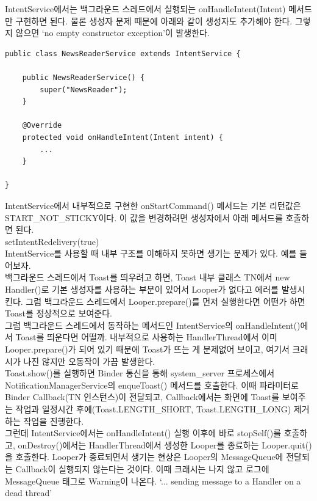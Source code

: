 IntentService에서는 백그라운드 스레드에서 실행되는 onHandleIntent(Intent) 메서드만 구현하면 된다.
물론 생성자 문제 때문에 아래와 같이 생성자도 추가해야 한다. 그렇지 않으면 `no empty constructor exception'이 발생한다. 
\begin{lstlisting}[frame=single]
public class NewsReaderService extends IntentService {

	public NewsReaderService() {
		super("NewsReader");
	}

	@Override
	protected void onHandleIntent(Intent intent) {
		...
	}
	
}	
\end{lstlisting}
IntentService에서 내부적으로 구현한 onStartCommand() 메서드는 기본 리턴값은 START\_NOT\_STICKY이다. 이 값을 변경하려면 생성자에서 아래 메서드를 호출하면 된다.\\ 

setIntentRedelivery(true)\\

IntentService를 사용할 때 내부 구조를 이해하지 못하면 생기는 문제가 있다. 
예를 들어보자.\\

백그라운드 스레드에서 Toast를 띄우려고 하면, Toast 내부 클래스 TN에서 new Handler()로 기본 생성자를 사용하는 부분이 있어서 Looper가 없다고 에러를 발생시킨다. 그럼 백그라운드 스레드에서 Looper.prepare()를 먼저 실행한다면 어떤가 하면 Toast를 정상적으로 보여준다.\\

그럼 백그라운드 스레드에서 동작하는 메서드인 IntentService의 onHandleIntent()에서 Toast를 띄운다면 어떨까. 
내부적으로 사용하는 HandlerThread에서 이미 Looper.prepare()가 되어 있기 때문에 Toast가 뜨는 게 문제없어 보이고, 여기서 크래시가 나진 않지만 오동작이 가끔 발생한다.\\

Toast.show()를 실행하면 Binder 통신을 통해 system\_server 프로세스에서 NotificationManagerService의 enqueToast() 메서드를 호출한다. 이때 파라미터로 Binder Callback(TN 인스턴스)이 전달되고, Callback에서는 화면에 Toast를 보여주는 작업과 일정시간 후에(Toast.LENGTH\_SHORT, Toast.LENGTH\_LONG) 제거하는 작업을 진행한다.\\

그런데 IntentService에서는 onHandleIntent() 실행 이후에 바로 stopSelf()를 호출하고, onDestroy()에서는 HandlerThread에서 생성한 Looper를 종료하는 Looper.quit()을 호출한다. Looper가 종료되면서 생기는 현상은 Looper의 MessageQueue에 전달되는 Callback이 실행되지 않는다는 것이다.
이때 크래시는 나지 않고 로그에 MessageQueue 태그로 Warning이 나온다. `... sending message to a Handler on a dead thread'\\

